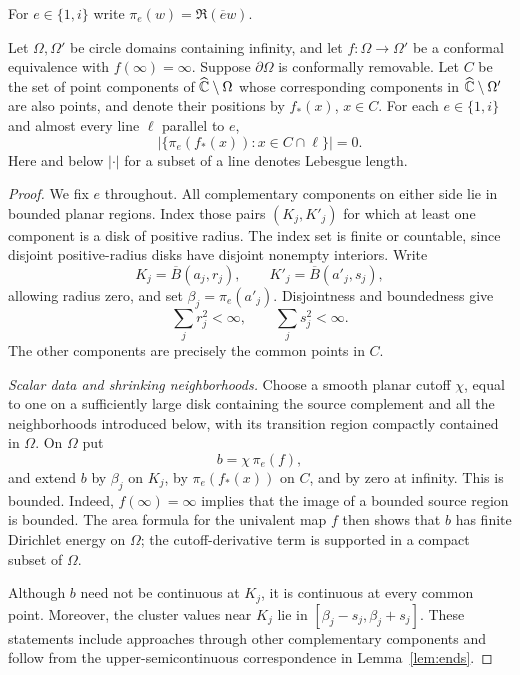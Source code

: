For $e\in\{1,i\}$ write $\pi_e(w)=\Re(\overline e w)$.
\begin{proposition}\label{prop:trace-null}
Let $\Omega,\Omega'$ be circle domains containing infinity, and let
$f:\Omega\to\Omega'$ be a conformal equivalence with $f(\infty)=\infty$.
Suppose $\partial\Omega$ is conformally removable.  Let $C$ be the set
of point components of $\widehat{\mathbb C}\setminus\Omega$ whose corresponding
components in $\widehat{\mathbb C}\setminus\Omega'$ are also points, and denote their
positions by $f_*(x)$, $x\in C$.  For each $e\in\{1,i\}$ and almost
every line $\ell$ parallel to $e$,
\[
 \bigl|\{\pi_e(f_*(x)):x\in C\cap\ell\}\bigr|=0.
\]
Here and below $|\cdot|$ for a subset of a line denotes Lebesgue length.
\end{proposition}
\begin{proof}
We fix $e$ throughout.  All complementary components on either side
lie in bounded planar regions.  Index those pairs $(K_j,K'_j)$ for
which at least one component is a disk of positive radius.  The index
set is finite or countable, since disjoint positive-radius disks have
disjoint nonempty interiors.  Write
\[
 K_j=\overline B(a_j,r_j),\qquad
 K'_j=\overline B(a'_j,s_j),
\]
allowing radius zero, and set $\beta_j=\pi_e(a'_j)$.  Disjointness and
boundedness give
\begin{equation}\label{eq:trace-radius-sums}
 \sum_jr_j^2<\infty,\qquad \sum_js_j^2<\infty.
\end{equation}
The other components are precisely the common points in $C$.

\smallskip\noindent
\emph{Scalar data and shrinking neighborhoods.}
Choose a smooth planar cutoff $\chi$, equal to one on a sufficiently
large disk containing the source complement and all the neighborhoods
introduced below, with its transition region compactly contained in
$\Omega$.  On $\Omega$ put
\[
 b=\chi\,\pi_e(f),
\]
and extend $b$ by $\beta_j$ on $K_j$, by $\pi_e(f_*(x))$ on $C$, and
by zero at infinity.  This is bounded.  Indeed, $f(\infty)=\infty$
implies that the image of a bounded source region is bounded.  The
area formula for the univalent map $f$ then shows that $b$ has finite
Dirichlet energy on $\Omega$; the cutoff-derivative term is supported
in a compact subset of $\Omega$.

Although $b$ need not be continuous at $K_j$, it is continuous at
every common point.  Moreover, the cluster values near $K_j$ lie in
$[\beta_j-s_j,\beta_j+s_j]$.  These statements include approaches
through other complementary components and follow from the
upper-semicontinuous correspondence in Lemma~\ref{lem:ends}.


\end{proof}
